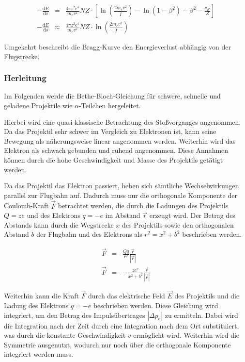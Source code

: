 \documentclass[12pt,a4paper]{scrartcl}
\numberwithin{equation}{section} %
\renewcommand{\[}{} %
\renewcommand{\]}{\noindent} %
\begin{document}
\[
\begin{eqnarray}
        -\frac{\mathrm dE}{\mathrm ds} &=&
                \frac{4\pi z^2 e^4}{m_e v^2} NZ \cdot
                \left[
                        \ln\left(\frac{2m_ev^2}{\bar I}\right)
                        - \ln\left(1 - \beta^2\right)
                        - \beta^2
                        - \frac{c_K}{Z}
                \right] \\
        -\frac{\mathrm dE}{\mathrm ds} &\approx&
                \frac{4\pi z^2 e^4}{m_e v^2} NZ \cdot
                \ln\left(\frac{2m_ev^2}{\bar I}\right)
\end{eqnarray}
\]

Umgekehrt beschreibt die Bragg-Kurve den Energieverlust abhängig von der
Flugstrecke.

\hypertarget{herleitung}{%
\subsubsection{Herleitung}\label{herleitung}}

Im Folgenden werde die Bethe-Bloch-Gleichung für schwere, schnelle und
geladene Projektile wie $\alpha$-Teilchen hergeleitet.

Hierbei wird eine quasi-klassische Betrachtung des Stoßvorganges
angenommen. Da das Projektil sehr schwer im Vergleich zu Elektronen ist,
kann seine Bewegung als näherungsweise linear angenommen werden.
Weiterhin wird das Elektron als schwach gebunden und ruhend angenommen.
Diese Annahmen können durch die hohe Geschwindigkeit und Masse des
Projektils getätigt werden.

Da das Projektil das Elektron passiert, heben sich sämtliche
Wechselwirkungen parallel zur Flugbahn auf. Dadurch muss nur die
orthogonale Komponente der Coulomb-Kraft $\vec F$ betrachtet werden,
die durch die Ladungen des Projektils $Q=ze$ und des Elektrons
$q=-e$ im Abstand $\vec r$ erzeugt wird. Der Betrag des Abstands
kann durch die Wegstrecke $x$ des Projektils sowie den orthogonalen
Abstand $b$ der Flugbahn und des Elektrons als $r^2=x^2+b^2$
beschrieben werden.

\[
\begin{eqnarray}
        \vec F &=& \frac{Qq}{r^2} \frac{\vec{r}}{\left|\vec r\right|} \\
        \vec F &=& -\frac{ze^2}{x^2+b^2} \frac{\vec{r}}{\left|\vec r\right|}
\end{eqnarray}
\]

Weiterhin kann die Kraft $\vec F$ durch das elektrische Feld
$\vec E$ des Projektils und die Ladung des Elektrons $q=-e$
beschrieben werden. Diese Gleichung wird integriert, um den Betrag des
Impulsübertrages $\left|\Delta p_e\right|$ zu ermitteln. Dabei wird
die Integration nach der Zeit durch eine Integration nach dem Ort
substituiert, was durch die konstante Geschwindigkeit $v$ ermöglicht
wird. Weiterhin wird die Symmetrie ausgenutzt, wodurch nur noch über die
orthogonale Komponente integriert werden muss.
\end{document}
